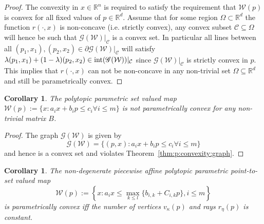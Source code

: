 \documentclass[journal]{IEEEtran}
\newcounter{thmcount}
\newtheorem{cor}[thmcount]{Corollary}
\theoremstyle{remark}
\theoremstyle{definition}
\begin{document}
%
\begin{proof}
The convexity in $x\in\mathbb R^n$ is required to satisfy the requirement that $\mathcal W(p)$ is convex
for all fixed values of $p\in\mathbb R^d$. 
%
Assume that for some region $\Omega\subset\mathbb R^d$ the function $r(\cdot,x)$ is non-concave (i.e. 
strictly convex), any convex subset $\mathcal C\subseteq\Omega$ will hence be such that $\mathscr 
G(\mathcal W)\vert_{\mathcal C}$ is a convex set.
%
In particular all lines between all $(p_1,x_1),(p_2,x_2)\in \partial\mathscr G(\mathcal W)\vert_{\mathcal C}$ will satisfy
$\lambda (p_1,x_1) + (1-\lambda) (p_2,x_2) \in\textup{int} (\mathscr G(\mathcal W))\vert_{\mathcal C}$ since
$\mathscr G(\mathcal W)\vert_{\mathcal C}$ is strictly convex in $p$.
%
This implies that $r(\cdot,x)$ can not be non-concave in any non-trivial set $\Omega\subseteq\mathbb R^d$ and still
be parametrically convex.
\end{proof}
%
\begin{cor}\label{thm:polytopic:set:not:p:convex}
The polytopic parametric set valued map $\mathcal W(p):=\{x: a_i x + b_i p\leq c_i \forall i\leq m\}$ is not parametrically convex for 
any non-trivial matrix $B$.
\end{cor}
%
\begin{proof}
The graph $\mathscr G(\mathcal W)$ is given by
%
\begin{equation*}
	\mathscr G(\mathcal W) = \{(p,x):a_i x + b_i p\leq c_i \forall i\leq m\}
\end{equation*}
%
and hence is a convex set and violates Theorem~\ref{thm:p:convexity:graph}.
\end{proof}
%
\begin{cor}\label{thm:p:convexity:PWA:set:constant:num:verts}
The non-degenerate piecewise affine polytopic parametric point-to-set valued map 
%
\begin{equation}\label{eq:definition:PWA:polytopic:set:general}
  \mathcal W(p) := \left\{x: a_i x \leq \max_{k\leq l}\{b_{i,k} + C_{i,k}p\},i\leq m\right\}
\end{equation}
%
is parametrically convex iff the number of vertices $v_\kappa(p)$ and rays $r_\eta(p)$ is constant.
\end{cor}
%
\end{document}

